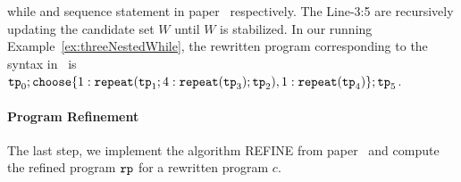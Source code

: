 while and sequence statement in paper~\cite{GulwaniJK09} respectively.
The Line-3:5 are recursively updating the candidate set $W$ until $W$ is stabilized.
In our running Example~\ref{ex:threeNestedWhile}, the rewritten program corresponding to the syntax in~\cite{GulwaniJK09} is
$ \tpath_0 ; \rpchoose{ 1: \rprepeat(\tpath_1; 4:\rprepeat(\tpath_3); \tpath_2), 
1: \rprepeat(\tpath_4) }; \tpath_5$.

\paragraph{Program Refinement}
The last step, we implement the algorithm REFINE from paper~\cite{GulwaniJK09} and compute the 
refined program $\mathtt{rp}$ for a rewritten program $c$.



